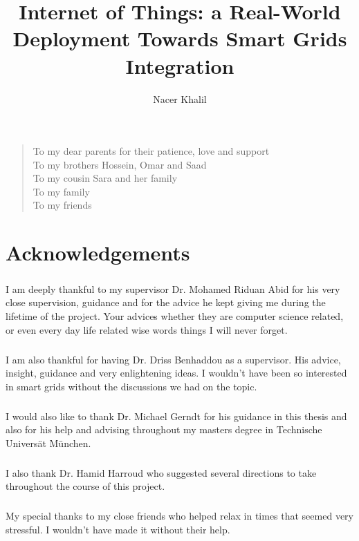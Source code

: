 \documentclass[oneside,12pt,a4paper,final]{book}
\author{Nacer Khalil}
\title{Internet of Things: a Real-World Deployment Towards Smart Grids Integration}
\newenvironment{dedication}{\vspace{6ex}\begin{quotation}\begin{center}\begin{em}}{\par\end{em}\end{center}\end{quotation}}
\begin{document}
\doublespacing

\frontmatter


\chapter{} %
\begin{dedication}
To my dear parents for their patience, love and support \\
To my brothers Hossein, Omar and Saad \\
To my cousin Sara and her family \\
To my family \\
To my friends
\end{dedication}
\chapter{Acknowledgements}
\paragraph{}
I am deeply thankful to my supervisor Dr. Mohamed Riduan Abid for his very close supervision, guidance and for the advice he kept giving me during the lifetime of the project. Your advices whether they are computer science related, or even every day life related wise words things I will never forget.
\paragraph*{}
I am also thankful for having Dr. Driss Benhaddou as a supervisor. His advice, insight, guidance and very enlightening ideas. I wouldn't have been so interested in smart grids without the discussions we had on the topic.
\paragraph{}
I would also like to thank Dr. Michael Gerndt for his guidance in this thesis and also for his help and advising throughout my masters degree in Technische Universät München.
\paragraph{}
I  also thank Dr. Hamid Harroud who suggested several directions to take throughout the course of this project.
\paragraph{}
My special thanks to my close friends who helped relax in times that seemed very stressful. I wouldn't have made it without their help.
\end{document}
